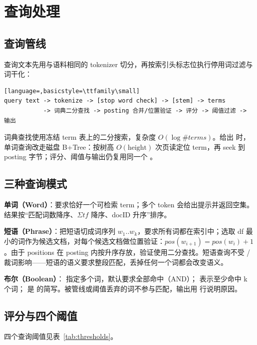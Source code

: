 \section{查询处理}

\subsection{查询管线}

查询文本先用与语料相同的 tokenizer 切分，再按索引头标志位执行停用词过滤与词干化：

\begin{lstlisting}[language=,basicstyle=\ttfamily\small]
query text -> tokenize -> [stop word check] -> [stem] -> terms
           -> 词典二分查找 -> posting 合并/位置验证 -> 评分 -> 阈值过滤 -> 输出
\end{lstlisting}

词典查找使用冻结 term 表上的二分搜索，复杂度 $O(\log \#terms)$。给出  时，单词查询改走磁盘 B+Tree：按树高 $O(\text{height})$ 次页读定位 term，再 seek 到 posting 字节；评分、阈值与输出仍复用同一个 。

\subsection{三种查询模式}

\textbf{单词（Word）}：要求恰好一个可检索 term；多个 token 会给出提示并返回空集。结果按“匹配词数降序、$\Sigma tf$ 降序、docID 升序”排序。

\textbf{短语（Phrase）}：把短语切成词序列 $w_1..w_k$，要求所有词都在索引中；选取 df 最小的词作为候选文档，对每个候选文档做位置验证：$pos(w_{i+1}) = pos(w_i) + 1$。由于 positions 在 posting 内按升序存放，验证使用二分查找。短语查询不受  /  裁词影响——短语的语义要求整段匹配，丢掉任何一个词都会改变语义。

\textbf{布尔（Boolean）}： 指定多个词，默认要求全部命中（AND）； 表示至少命中 k 个词； 是  的简写。被管线或阈值丢弃的词不参与匹配，输出用  行说明原因。

\subsection{评分与四个阈值}

四个查询阈值见表~\ref{tab:thresholds}。

